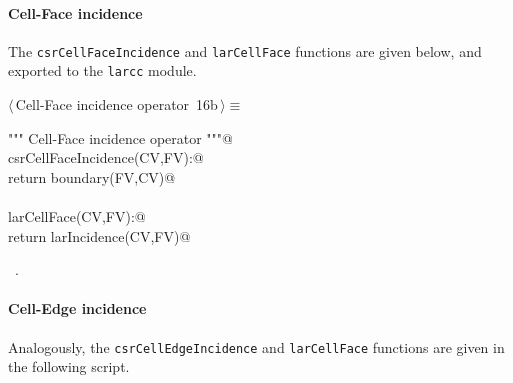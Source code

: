 \documentclass[11pt,oneside]{article}	%
\begin{document}
\paragraph{Cell-Face incidence}
The \texttt{csrCellFaceIncidence} and \texttt{larCellFace} functions are given below, and exported to the \texttt{larcc} module.
\begin{flushleft} \small \label{scrap27}
\protect{}$\langle\,$Cell-Face incidence operator\nobreak\ {\footnotesize 16b}$\,\rangle\equiv$
\vspace{-1ex}
\begin{list}{}{} \item
\mbox{}\verb@""" Cell-Face incidence operator """@\\
\mbox{}\verb@def csrCellFaceIncidence(CV,FV):@\\
\mbox{}\verb@   return boundary(FV,CV)@\\
\mbox{}\verb@@\\
\mbox{}\verb@def larCellFace(CV,FV):@\\
\mbox{}\verb@   return larIncidence(CV,FV)@\\
\mbox{}\verb@@{\NWsep}
\end{list}
\vspace{-1ex}
\footnotesize\addtolength{\baselineskip}{-1ex}
\begin{list}{}{\setlength{\itemsep}{-\parsep}\setlength{\itemindent}{-\leftmargin}}
\item \NWtxtMacroRefIn\ .
\end{list}
\end{flushleft}

\paragraph{Cell-Edge incidence}
Analogously, the \texttt{csrCellEdgeIncidence} and \texttt{larCellFace} functions are given in the following script.
\end{document}
